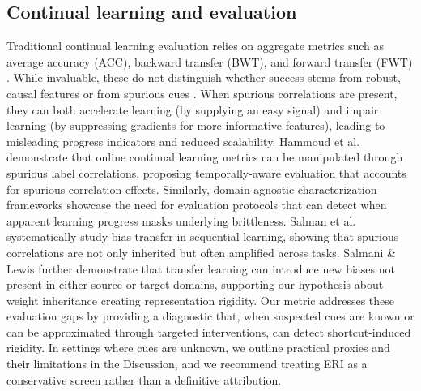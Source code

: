 \documentclass[conference]{IEEEtran}
\begin{document}
\subsection{Continual learning and evaluation}
Traditional continual learning evaluation relies on aggregate metrics such as average accuracy (ACC), backward transfer (BWT), and forward transfer (FWT) \cite{vandeVen2024ContinualLA}. While invaluable, these do not distinguish whether success stems from robust, causal features or from spurious cues \cite{Ashley2021DoesTA,Marconato2022CatastrophicFI, Wang2023WhereTF,Sun2024RevivingDM}. When spurious correlations are present, they can both accelerate learning (by supplying an easy signal) and impair learning (by suppressing gradients for more informative features), leading to misleading progress indicators and reduced scalability. Hammoud et al. \cite{hammoud2023rapidadaptationonlinecontinual} demonstrate that online continual learning metrics can be manipulated through spurious label correlations, proposing temporally-aware evaluation that accounts for spurious correlation effects. Similarly, domain-agnostic characterization frameworks \cite{BAKER2023274} showcase the need for evaluation protocols that can detect when apparent learning progress masks underlying brittleness. Salman et al. \cite{salman2022doesbiastransfertransfer} systematically study bias transfer in sequential learning, showing that spurious correlations are not only inherited but often amplified across tasks. Salmani \& Lewis \cite{salmani2024transferlearningbias} further demonstrate that transfer learning can introduce new biases not present in either source or target domains, supporting our hypothesis about weight inheritance creating representation rigidity. Our metric addresses these evaluation gaps by providing a diagnostic that, when suspected cues are known or can be approximated through targeted interventions, can detect shortcut-induced rigidity. In settings where cues are unknown, we outline practical proxies and their limitations in the Discussion, and we recommend treating ERI as a conservative screen rather than a definitive attribution.
\end{document}
